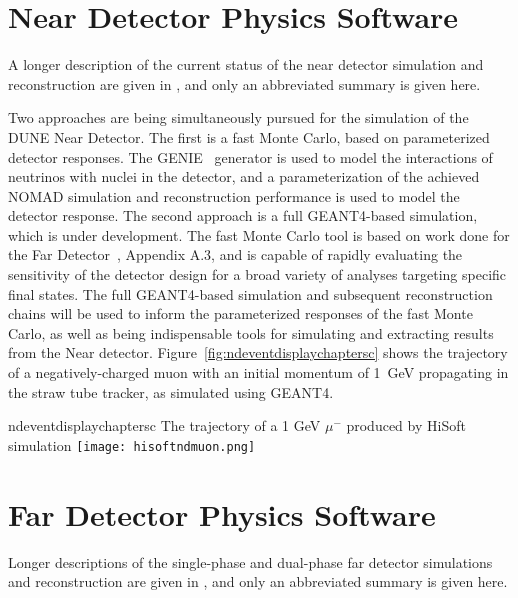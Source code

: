 \section{Near Detector Physics Software}
\label{sec:detectors-sc-nd-physics-software}

A longer description of the current status of the near detector simulation and reconstruction are given
in \anxreco, and only an abbreviated summary is given here.

Two approaches are being simultaneously pursued for the simulation of the DUNE Near Detector.  The first is a fast Monte Carlo,
based on parameterized detector responses. The GENIE~\cite{GENIE} generator is used to model the interactions of neutrinos
with nuclei in the detector, and a parameterization of the achieved NOMAD simulation and reconstruction performance is used to
model the detector response.
The second approach is a full GEANT4-based simulation, which is under development.  The fast Monte Carlo tool is based on work done for
the Far Detector~\cite{Adams:2013qkq}, Appendix A.3, and is capable of rapidly evaluating the sensitivity of the detector
design for a broad variety of analyses targeting specific final states.   The full GEANT4-based simulation and subsequent reconstruction
chains will be used to inform the parameterized responses of the fast Monte Carlo, as well as being indispensable tools for simulating
and extracting results from the Near detector.  Figure~\ref{fig:ndeventdisplaychaptersc} shows the trajectory of a
negatively-charged muon with an initial momentum of 1~GeV propagating in the straw tube tracker, as simulated using GEANT4.

\begin{cdrfigure}{ndeventdisplaychaptersc}
{The trajectory of a 1 GeV $\mu^-$ produced by HiSoft simulation}
\texttt{[image: hisoftndmuon.png]}
\end{cdrfigure}

\section{Far Detector Physics Software}
\label{sec:detectors-sc-physics-software}

Longer descriptions of the single-phase and dual-phase far detector simulations and reconstruction are given
in \anxreco, and only an abbreviated summary is given here.

